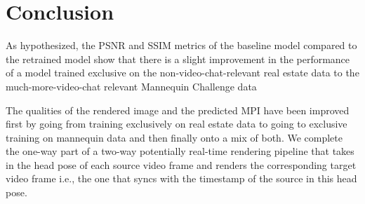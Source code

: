 \chapter{Conclusion}\label{ch:conclusion}

As hypothesized, the PSNR and SSIM metrics of the baseline model compared to the retrained model show that there is a slight improvement in the performance of a model trained exclusive on the non-video-chat-relevant real estate data to the much-more-video-chat relevant Mannequin Challenge data 

The qualities of the rendered image and the predicted MPI have been improved first by going from training exclusively on real estate data to going to exclusive training on mannequin data and then finally onto a mix of both. We complete the one-way part of a two-way potentially real-time rendering pipeline that takes in the head pose of each source video frame and renders the corresponding target video frame i.e., the one that syncs with the timestamp of the source in this head pose.

% 